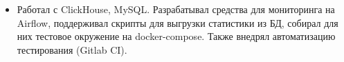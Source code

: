 \begin{itemize}
    \item Работал с ClickHouse, MySQL. Разрабатывал средства для мониторинга на Airflow, поддерживал скрипты для выгрузки статистики из БД, собирал для них тестовое окружение на docker-compose. Также внедрял автоматизацию тестирования (Gitlab CI).
\end{itemize}
